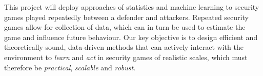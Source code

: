 



This project will deploy approaches of {statistics} and {machine learning} to security games  played repeatedly between a defender and attackers. Repeated security games allow for collection of data, which can in turn be used to estimate the game and influence future behaviour. %
Our key objective is to design efficient and theoretically sound, data-driven methods that can actively interact with the environment to {\em learn} and {\em act} in security games of realistic scales, which must therefore be \textit{practical}, \textit{scalable} and \textit{robust}. 

